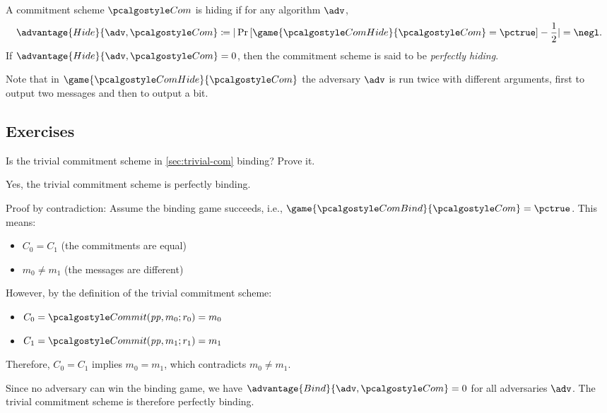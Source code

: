 \begin{definition}[Hiding]
  A commitment scheme $\algo{Com}$ is hiding if for any \ppt algorithm $\adv$,
 \[
  \advantage{Hide}{\adv, \algo{Com}} \defeq |\pr{\game{\algo{ComHide}}{\algo{Com}} = \pctrue} - \frac{1}{2}| = \negl.
 \]
 If $\advantage{Hide}{\adv, \algo{Com}} = 0$, then the commitment scheme is said to be \emph{perfectly hiding}.
\end{definition}

Note that in $\game{\algo{ComHide}}{\algo{Com}}$ the adversary $\adv$ is run twice with different arguments, first to output two messages and then to output a bit.

\subsection{Exercises}

\begin{exercise}
  Is the trivial commitment scheme in \cref{sec:trivial-com} binding?
  Prove it.
\end{exercise}

\ifsolutions
\begin{mysolution}
  Yes, the trivial commitment scheme is perfectly binding.
  
  Proof by contradiction: Assume the binding game succeeds, i.e., $\game{\algo{ComBind}}{\algo{Com}} = \pctrue$.
  This means:
  \begin{itemize}
    \item $C_0 = C_1$ (the commitments are equal)
    \item $m_0 \neq m_1$ (the messages are different)
  \end{itemize}
  
  However, by the definition of the trivial commitment scheme:
  \begin{itemize}
    \item $C_0 = \algo{Commit}(\params, m_0; r_0) = m_0$
    \item $C_1 = \algo{Commit}(\params, m_1; r_1) = m_1$
  \end{itemize}
  
  Therefore, $C_0 = C_1$ implies $m_0 = m_1$, which contradicts $m_0 \neq m_1$.
  
  Since no adversary can win the binding game, we have $\advantage{Bind}{\adv, \algo{Com}} = 0$ for all adversaries $\adv$.
  The trivial commitment scheme is therefore perfectly binding.
\end{mysolution}
\fi

